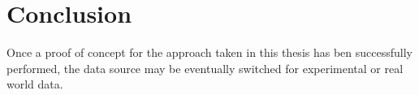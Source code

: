 
\chapter{Conclusion}\label{chapter:conclusion}

 Once a proof of concept for the approach taken in this thesis has ben successfully performed, the data source may be eventually switched for experimental or real world data.